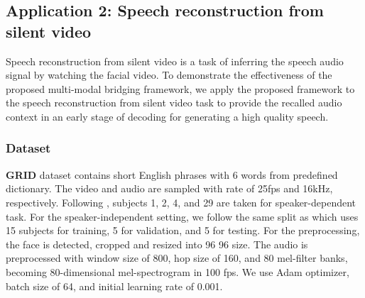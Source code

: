 \documentclass[10pt,twocolumn,letterpaper]{article}
\begin{document}
\begin{table}[]
    \renewcommand{\arraystretch}{1.2}
	\renewcommand{\tabcolsep}{7mm}
    \vspace{0cm}
    \caption{Lip reading word accuracy comparison with visual modal inputs on LRW and LRW-1000 dataset.}
    \vspace{-0.5cm}
	\label{table:1}
\end{table}

\subsection{Application 2: Speech reconstruction from silent video} 
\label{sec:4.2}

Speech reconstruction from silent video is a task of inferring the speech audio signal by watching the facial video. To demonstrate the effectiveness of the proposed multi-modal bridging framework, we apply the proposed framework to the speech reconstruction from silent video task to provide the recalled audio context in an early stage of decoding for generating a high quality speech.
\vspace{-0.2cm}
\subsubsection{Dataset}
\vspace{-0.2cm}
{\bf GRID} dataset \cite{cooke2006grid} contains short English phrases with 6 words from predefined dictionary. The video and audio are sampled with rate of 25fps and 16kHz, respectively. Following \cite{ganbased,l2w}, subjects 1, 2, 4, and 29 are taken for speaker-dependent task. For the speaker-independent setting, we follow the same split as \cite{ganbased} which uses 15 subjects for training, 5 for validation, and 5 for testing. For the preprocessing, the face is detected, cropped and resized into 96  96 size. The audio is preprocessed with window size of 800, hop size of 160, and 80 mel-filter banks, becoming 80-dimensional mel-spectrogram in 100 fps. We use Adam optimizer, batch size of 64, and initial learning rate of 0.001.
\end{document}
